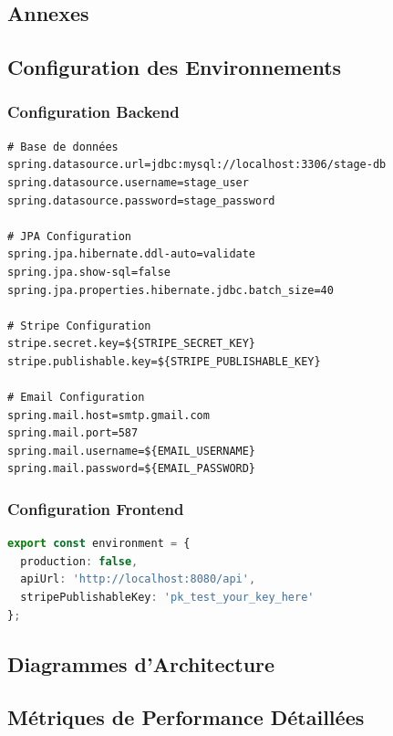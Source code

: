 \documentclass[12pt,a4paper]{report}
\begin{document}
\begin{appendices}

\chapter{Annexes}

\section{Configuration des Environnements}

\subsection{Configuration Backend}
\begin{lstlisting}[language=properties, caption=application.properties]
# Base de données
spring.datasource.url=jdbc:mysql://localhost:3306/stage-db
spring.datasource.username=stage_user
spring.datasource.password=stage_password

# JPA Configuration
spring.jpa.hibernate.ddl-auto=validate
spring.jpa.show-sql=false
spring.jpa.properties.hibernate.jdbc.batch_size=40

# Stripe Configuration
stripe.secret.key=${STRIPE_SECRET_KEY}
stripe.publishable.key=${STRIPE_PUBLISHABLE_KEY}

# Email Configuration
spring.mail.host=smtp.gmail.com
spring.mail.port=587
spring.mail.username=${EMAIL_USERNAME}
spring.mail.password=${EMAIL_PASSWORD}
\end{lstlisting}

\subsection{Configuration Frontend}
\begin{lstlisting}[language=typescript, caption=environment.ts]
export const environment = {
  production: false,
  apiUrl: 'http://localhost:8080/api',
  stripePublishableKey: 'pk_test_your_key_here'
};
\end{lstlisting}

\section{Diagrammes d'Architecture}


\section{Métriques de Performance Détaillées}


\end{appendices}
\end{document}
